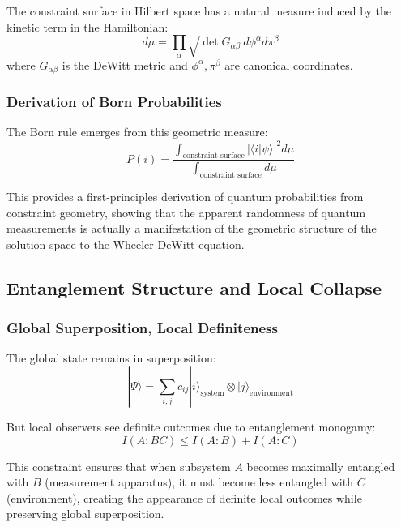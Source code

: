 \documentclass[12pt,a4paper]{article}
\newcommand{\ket}[1]{|#1\rangle}
\begin{document}
The constraint surface in Hilbert space has a natural measure induced by the kinetic term in the Hamiltonian:
\begin{equation}
    d\mu = \prod_{\alpha} \sqrt{\det G_{\alpha\beta}} \, d\phi^{\alpha} d\pi^{\beta}
\end{equation}
where $G_{\alpha\beta}$ is the DeWitt metric and $\phi^{\alpha}, \pi^{\beta}$ are canonical coordinates.

\subsubsection{Derivation of Born Probabilities}

The Born rule emerges from this geometric measure:
\begin{equation}
    P(i) = \frac{\int_{\text{constraint surface}} |\langle i|\psi\rangle|^2 d\mu}{\int_{\text{constraint surface}} d\mu}
\end{equation}

This provides a first-principles derivation of quantum probabilities from constraint geometry, showing that the apparent randomness of quantum measurements is actually a manifestation of the geometric structure of the solution space to the Wheeler-DeWitt equation.

\subsection{Entanglement Structure and Local Collapse}

\subsubsection{Global Superposition, Local Definiteness}

The global state remains in superposition:
\begin{equation}
    \ket{\Psi} = \sum_{i,j} c_{ij} \ket{i}_{\text{system}} \otimes \ket{j}_{\text{environment}}
\end{equation}

But local observers see definite outcomes due to entanglement monogamy:
\begin{equation}
    I(A:BC) \leq I(A:B) + I(A:C)
\end{equation}

This constraint ensures that when subsystem $A$ becomes maximally entangled with $B$ (measurement apparatus), it must become less entangled with $C$ (environment), creating the appearance of definite local outcomes while preserving global superposition.
\end{document}
